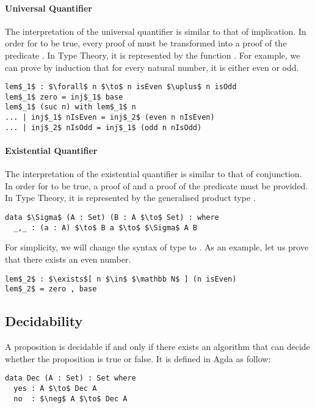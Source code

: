 \paragraph{Universal Quantifier} The interpretation of the universal
quantifier is similar to that of implication. In order for  to be true, every
proof  of  must be transformed into a proof of the predicate
. In Type Theory, it is represented by the function . For example, we can prove by induction that for every natural
number, it is either even or odd.
\begin{lstlisting}[mathescape=true,xleftmargin=.3\textwidth]
lem$_1$ : $\forall$ n $\to$ n isEven $\uplus$ n isOdd
lem$_1$ zero = inj$_1$ base
lem$_1$ (suc n) with lem$_1$ n
... | inj$_1$ nIsEven = inj$_2$ (even n nIsEven)
... | inj$_2$ nIsOdd = inj$_1$ (odd n nIsOdd)
\end{lstlisting} 

\paragraph{Existential Quantifier} The interpretation of the
existential quantifier is similar to that of conjunction. In order for
 to be true, a proof  of  and a proof of the predicate
 must be provided. In Type Theory, it is represented by the generalised
product type \mb{\Sigma}. 
\begin{lstlisting}[mathescape=true,xleftmargin=.3\textwidth]
data $\Sigma$ (A : Set) (B : A $\to$ Set) : where
  _,_ : (a : A) $\to$ B a $\to$ $\Sigma$ A B
\end{lstlisting}

\par For simplicity, we will change the syntax of \mb{\Sigma} type to
. As an example, let us prove that
there exists an even number. 
\begin{lstlisting}[mathescape=true,xleftmargin=.3\textwidth]
lem$_2$ : $\exists$[ n $\in$ $\mathbb N$ ] (n isEven)
lem$_2$ = zero , base
\end{lstlisting}


\subsection{Decidability} 
\par A proposition is decidable if and only if there
exists an algorithm that can decide whether the proposition is true or false. It is
defined in Agda as follow: 
\begin{lstlisting}[mathescape=true,xleftmargin=.3\textwidth]
data Dec (A : Set) : Set where
  yes : A $\to$ Dec A
  no  : $\neg$ A $\to$ Dec A
\end{lstlisting}

